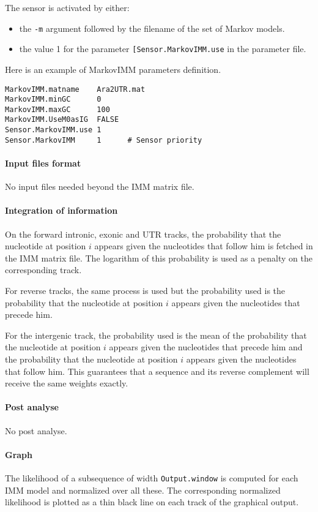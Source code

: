 The sensor is activated by either:
\begin{itemize}
\item the \texttt{-m} argument followed by the filename of the set of Markov models.
\item the value 1 for the parameter \texttt{[Sensor.MarkovIMM.use} in
  the parameter file.
\end{itemize}

Here is an example of MarkovIMM parameters definition.
\begin{Verbatim}[fontsize=\small]
MarkovIMM.matname    Ara2UTR.mat
MarkovIMM.minGC      0
MarkovIMM.maxGC      100
MarkovIMM.UseM0asIG  FALSE
Sensor.MarkovIMM.use 1
Sensor.MarkovIMM     1      # Sensor priority
\end{Verbatim}


\paragraph{Input files format}

No input files needed beyond the IMM matrix file. 

\paragraph{Integration of information}

On the forward intronic, exonic and UTR tracks, the probability that
the nucleotide at position $i$ appears given the nucleotides that
follow him is fetched in the IMM matrix file. The logarithm of this
probability is used as a penalty on the corresponding track.

For reverse tracks, the same process is used but the probability used
is the probability that the nucleotide at position $i$ appears given
the nucleotides that precede him.

For the intergenic track, the probability used is the mean of the
probability that the nucleotide at position $i$ appears given the
nucleotides that precede him and the probability that the nucleotide
at position $i$ appears given the nucleotides that follow him.  This
guarantees that a sequence and its reverse complement will receive the
same weights exactly.

\paragraph{Post analyse}

No post analyse.

\paragraph{Graph}

The likelihood of a subsequence of width \texttt{Output.window} is
computed for each IMM model and normalized over all these. The
corresponding normalized likelihood is plotted as a thin black line on
each track of the graphical output.


